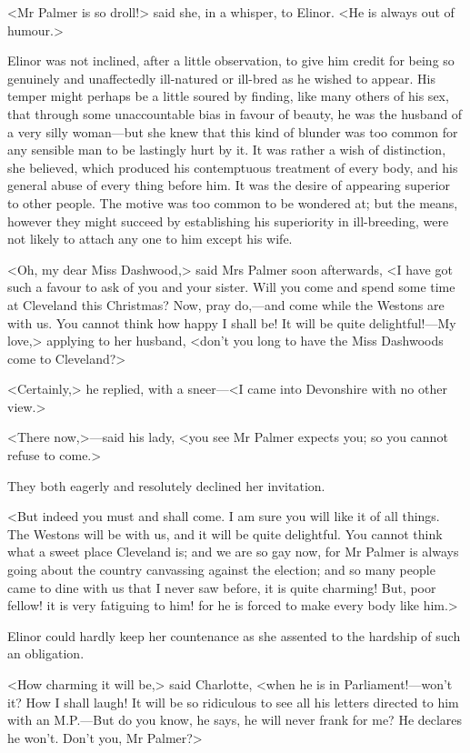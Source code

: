 <Mr Palmer is so droll!> said she, in a whisper, to Elinor. <He is always out of humour.>

Elinor was not inclined, after a little observation, to give him credit for being so genuinely and unaffectedly ill-natured or ill-bred as he wished to appear. His temper might perhaps be a little soured by finding, like many others of his sex, that through some unaccountable bias in favour of beauty, he was the husband of a very silly woman—but she knew that this kind of blunder was too common for any sensible man to be lastingly hurt by it. It was rather a wish of distinction, she believed, which produced his contemptuous treatment of every body, and his general abuse of every thing before him. It was the desire of appearing superior to other people. The motive was too common to be wondered at; but the means, however they might succeed by establishing his superiority in ill-breeding, were not likely to attach any one to him except his wife.

<Oh, my dear Miss Dashwood,> said Mrs Palmer soon afterwards, <I have got such a favour to ask of you and your sister. Will you come and spend some time at Cleveland this Christmas? Now, pray do,—and come while the Westons are with us. You cannot think how happy I shall be! It will be quite delightful!—My love,> applying to her husband, <don't you long to have the Miss Dashwoods come to Cleveland?>

<Certainly,> he replied, with a sneer—<I came into Devonshire with no other view.>

<There now,>—said his lady, <you see Mr Palmer expects you; so you cannot refuse to come.>

They both eagerly and resolutely declined her invitation.

<But indeed you must and shall come. I am sure you will like it of all things. The Westons will be with us, and it will be quite delightful. You cannot think what a sweet place Cleveland is; and we are so gay now, for Mr Palmer is always going about the country canvassing against the election; and so many people came to dine with us that I never saw before, it is quite charming! But, poor fellow! it is very fatiguing to him! for he is forced to make every body like him.>

Elinor could hardly keep her countenance as she assented to the hardship of such an obligation.

<How charming it will be,> said Charlotte, <when he is in Parliament!—won't it? How I shall laugh! It will be so ridiculous to see all his letters directed to him with an M\@.P\@.—But do you know, he says, he will never frank for me? He declares he won't. Don't you, Mr Palmer?>

